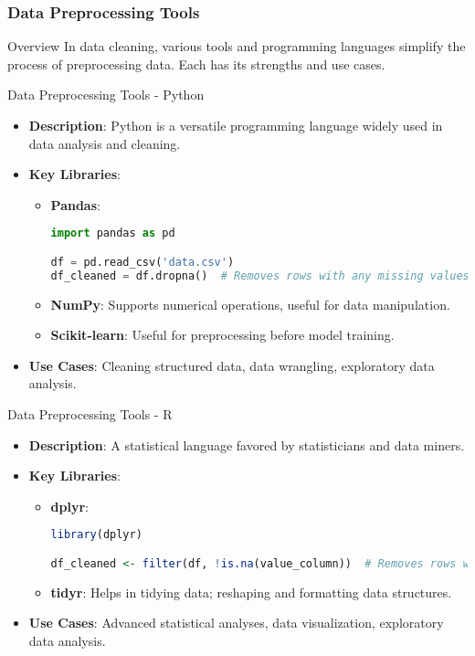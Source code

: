 \documentclass[aspectratio=169]{beamer}
\begin{document}
\begin{frame}
    \frametitle{Data Preprocessing Tools}
    \begin{block}{Overview}
        In data cleaning, various tools and programming languages simplify the process of preprocessing data. Each has its strengths and use cases.
    \end{block}
\end{frame}

\begin{frame}{Data Preprocessing Tools - Python}
    \begin{itemize}
        \item \textbf{Description}: Python is a versatile programming language widely used in data analysis and cleaning.
        \item \textbf{Key Libraries}:
            \begin{itemize}
                \item \textbf{Pandas}: 
                \begin{lstlisting}[language=Python]
import pandas as pd

df = pd.read_csv('data.csv')
df_cleaned = df.dropna()  # Removes rows with any missing values
                \end{lstlisting}
                \item \textbf{NumPy}: Supports numerical operations, useful for data manipulation.
                \item \textbf{Scikit-learn}: Useful for preprocessing before model training.
            \end{itemize}
        \item \textbf{Use Cases}: Cleaning structured data, data wrangling, exploratory data analysis.
    \end{itemize}
\end{frame}

\begin{frame}{Data Preprocessing Tools - R}
    \begin{itemize}
        \item \textbf{Description}: A statistical language favored by statisticians and data miners.
        \item \textbf{Key Libraries}:
            \begin{itemize}
                \item \textbf{dplyr}:
                \begin{lstlisting}[language=R]
library(dplyr)

df_cleaned <- filter(df, !is.na(value_column))  # Removes rows with NA in specified column
                \end{lstlisting}
                \item \textbf{tidyr}: Helps in tidying data; reshaping and formatting data structures.
            \end{itemize}
        \item \textbf{Use Cases}: Advanced statistical analyses, data visualization, exploratory data analysis.
    \end{itemize}
\end{frame}
\end{document}

